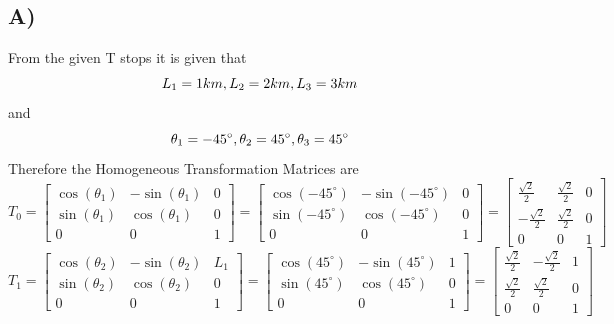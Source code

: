 \documentclass{article}
\begin{document}
\subsection*{A)}
From the given T stops it is given that
$$L_1=1km, \space L_2=2km, \space L_3=3km$$
and
$$\theta_1=-45^\circ, \space \theta_2=45^\circ, \space \theta_3=45^\circ$$
Therefore the Homogeneous Transformation Matrices are
\[
	T_0= \begin{bmatrix}
		\cos(\theta_1) & -\sin(\theta_1) & 0 \\
		\sin(\theta_1) & \cos(\theta_1)  & 0 \\
		0              & 0               & 1
	\end{bmatrix}
	=
	\begin{bmatrix}
		\cos(-45^\circ) & -\sin(-45^\circ) & 0 \\
		\sin(-45^\circ) & \cos(-45^\circ)  & 0 \\
		0               & 0                & 1
	\end{bmatrix}
	=
	\begin{bmatrix}
		\frac{\sqrt{2}}{2}  & \frac{\sqrt{2}}{2} & 0 \\
		-\frac{\sqrt{2}}{2} & \frac{\sqrt{2}}{2} & 0 \\
		0                   & 0                  & 1
	\end{bmatrix}
\]
\[
	T_1= \begin{bmatrix}
		\cos(\theta_2) & -\sin(\theta_2) & L_1 \\
		\sin(\theta_2) & \cos(\theta_2)  & 0   \\
		0              & 0               & 1
	\end{bmatrix}
	=
	\begin{bmatrix}
		\cos(45^\circ) & -\sin(45^\circ) & 1 \\
		\sin(45^\circ) & \cos(45^\circ)  & 0 \\
		0              & 0               & 1
	\end{bmatrix}
	=
	\begin{bmatrix}
		\frac{\sqrt{2}}{2} & -\frac{\sqrt{2}}{2} & 1 \\
		\frac{\sqrt{2}}{2} & \frac{\sqrt{2}}{2}  & 0 \\
		0                  & 0                   & 1
	\end{bmatrix}
\]
\end{document}
